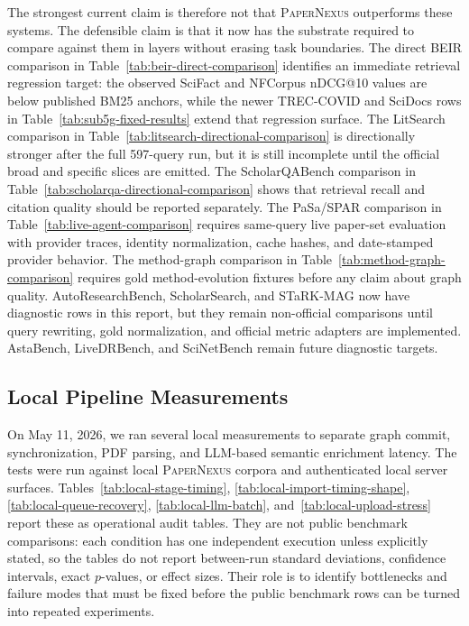 \documentclass[11pt]{article}
\newcommand{\papernexus}{\textsc{PaperNexus}}
\begin{document}
The strongest current claim is therefore not that \papernexus{} outperforms these systems. The defensible claim is that it now has the substrate required to compare against them in layers without erasing task boundaries. The direct BEIR comparison in Table~\ref{tab:beir-direct-comparison} identifies an immediate retrieval regression target: the observed SciFact and NFCorpus nDCG@10 values are below published BM25 anchors, while the newer TREC-COVID and SciDocs rows in Table~\ref{tab:sub5g-fixed-results} extend that regression surface. The LitSearch comparison in Table~\ref{tab:litsearch-directional-comparison} is directionally stronger after the full 597-query run, but it is still incomplete until the official broad and specific slices are emitted. The ScholarQABench comparison in Table~\ref{tab:scholarqa-directional-comparison} shows that retrieval recall and citation quality should be reported separately. The PaSa/SPAR comparison in Table~\ref{tab:live-agent-comparison} requires same-query live paper-set evaluation with provider traces, identity normalization, cache hashes, and date-stamped provider behavior. The method-graph comparison in Table~\ref{tab:method-graph-comparison} requires gold method-evolution fixtures before any claim about graph quality. AutoResearchBench, ScholarSearch, and STaRK-MAG now have diagnostic rows in this report, but they remain non-official comparisons until query rewriting, gold normalization, and official metric adapters are implemented. AstaBench, LiveDRBench, and SciNetBench remain future diagnostic targets.

\subsection{Local Pipeline Measurements}

On May 11, 2026, we ran several local measurements to separate graph commit, synchronization, PDF parsing, and LLM-based semantic enrichment latency. The tests were run against local \papernexus{} corpora and authenticated local server surfaces. Tables~\ref{tab:local-stage-timing}, \ref{tab:local-import-timing-shape}, \ref{tab:local-queue-recovery}, \ref{tab:local-llm-batch}, and~\ref{tab:local-upload-stress} report these as operational audit tables. They are not public benchmark comparisons: each condition has one independent execution unless explicitly stated, so the tables do not report between-run standard deviations, confidence intervals, exact \(p\)-values, or effect sizes. Their role is to identify bottlenecks and failure modes that must be fixed before the public benchmark rows can be turned into repeated experiments.
\end{document}
